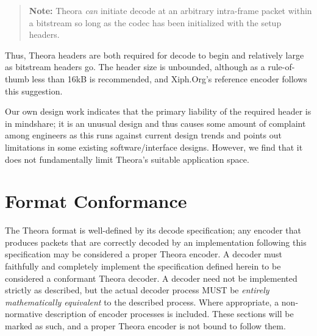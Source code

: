 \documentclass[9pt,letterpaper]{book}
\numberwithin{equation}{chapter}
\numberwithin{figure}{chapter}
\numberwithin{table}{chapter}
\begin{document}
\begin{verse}
{\bf Note:} Theora {\em can} initiate decode at an arbitrary intra-frame packet
 within a bitstream so long as the codec has been initialized with the setup
 headers.
\end{verse}

Thus, Theora headers are both required for decode to begin and relatively large
 as bitstream headers go.
The header size is unbounded, although as a rule-of-thumb less than 16kB is
 recommended, and Xiph.Org's reference encoder follows this suggestion.

Our own design work indicates that the primary liability of the required header
 is in mindshare; it is an unusual design and thus causes some amount of
 complaint among engineers as this runs against current design trends and
 points out limitations in some existing software/interface designs.
However, we find that it does not fundamentally limit Theora's suitable
 application space.

\section{Format Conformance}

The Theora format is well-defined by its decode specification; any encoder that
 produces packets that are correctly decoded by an implementation following
 this specification may be considered a proper Theora encoder.
A decoder must faithfully and completely implement the specification defined
 herein %
 to be considered a conformant Theora decoder.
A decoder need not be implemented strictly as described, but the
 actual decoder process MUST be {\em entirely mathematically equivalent}
 to the described process.
Where appropriate, a non-normative description of encoder processes is
 included.
These sections will be marked as such, and a proper Theora encoder is not
 bound to follow them.

\end{document}
